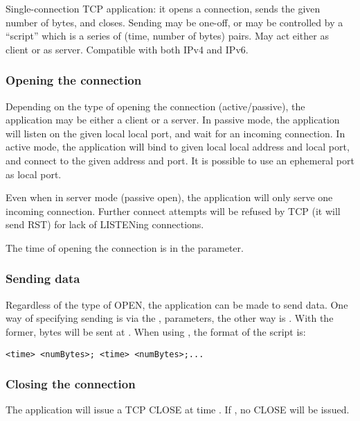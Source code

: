 Single-connection TCP application: it opens a connection, sends the given number
of bytes, and closes. Sending may be one-off, or may be controlled by a
``script'' which is a series of (time, number of bytes) pairs. May act either as
client or as server. Compatible with both IPv4 and IPv6.

\subsubsection*{Opening the connection}

Depending on the type of opening the connection (active/passive), the
application may be either a client or a server. In passive mode,
the application will listen on the given local local port, and wait for an
incoming connection. In active mode, the application will bind
to given local local address and local port, and connect to the
given address and port. It is possible to use an ephemeral port as
local port.

Even when in server mode (passive open), the application will only
serve one incoming connection. Further connect attempts will be
refused by TCP (it will send RST) for lack of LISTENing connections.

The time of opening the connection is in the  parameter.

\subsubsection*{Sending data}

Regardless of the type of OPEN, the application can be made to send
data. One way of specifying sending is via the , 
parameters, the other way is . With the former,
 bytes will be sent at . When using 
, the format of the script is:

\begin{verbatim}
<time> <numBytes>; <time> <numBytes>;...
\end{verbatim}

\subsubsection*{Closing the connection}

The application will issue a TCP CLOSE at time . If
, no CLOSE will be issued.



